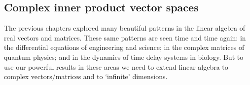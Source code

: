 \begin{draft}

\chapter{Complex inner product vector spaces}
\label{ch:cipvs}

\minitoc

The previous chapters explored many beautiful patterns in the linear algebra of real vectors and matrices.
These same patterns are seen time and time again: in the differential equations of engineering and science; in the complex matrices of quantum physics; and in the dynamics of time delay systems in biology.
But to use our powerful results in these areas we need to extend  linear algebra to complex vectors\slash matrices and to `infinite' dimensions.

\begin{comment}
Suggest not to include in a first version.

Plan to cover at a more abstract level \pooliv{Ch.6 and~7} \larsvii{Ch.5 and~8} \holti{Ch.10, \S11.4--5}:
\begin{itemize}
\item def (complex) vector space, incl functions
\item inner products and norms, incl integrals, basic orthog polys
\item generalised symmetric eigenproblem \(A\xv=\lambda B\xv\) and orthog with weighted inner product
\item linear transforms, range, kernel, with calculus applications
\item unitary matrices (poss quantum physics appl)
\item \svd: solutions and approximations
\item eigenproblem, linear independence, generalised eigenvectors, basis, change of basis, relate to FT, Hermitian matrices
\end{itemize}
\end{comment}

\end{draft}
